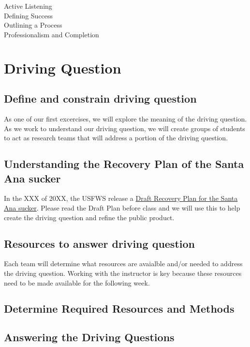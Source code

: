 \documentclass{article}\usepackage[]{graphicx}\usepackage[]{color}
\begin{document}
\begin{description}
  \item[Active Listening]
  \item[Defining Success]
  \item[Outlining a Process]
  \item[Professionalism and Completion]
\end{description}


\section{Driving Question}

\subsection{Define and constrain driving question}

As one of our first excercises, we will explore the meaning of the driving question. As we work to understand our driving question, we will create groups of students to act as research teams that will address a portion of the driving question.

\subsection{Understanding the Recovery Plan of the Santa Ana sucker}

In the XXX of 20XX, the USFWS release a \href{https://www.fws.gov/carlsbad/SpeciesStatusList/RP/201411xx_Draft%20RP_SASU.pdf}{Draft Recovery Plan for the Santa Ana sucker}. Please read the Draft Plan before class and we will use this to help create the driving question and refine the public product. 

\subsection{Resources to answer driving question}

Each team will determine what resources are avaialble and/or needed to address the driving question. Working with the instructor is key because these resources need to be made available for the following week.

\subsection{Determine Required Resources and Methods}


\subsection{Answering the Driving Questions}
\end{document}
